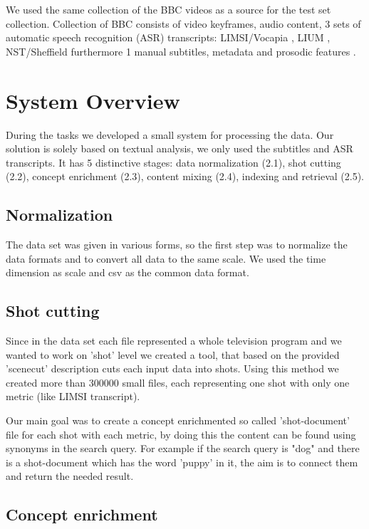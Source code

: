 \documentclass{acm_proc_article-me}
\begin{document}
We used the same collection of the BBC videos as a source for the test set collection. Collection of BBC consists of video keyframes, audio content, 3 sets of automatic speech recognition (ASR) transcripts: LIMSI/Vocapia \cite{gauvain2002limsi,lamel2012multilingual}, LIUM \cite{8307} , NST/Sheffield \cite{lanchantin2013automatic,hain2008automatic} furthermore 1 manual subtitles, metadata and prosodic features \cite{eyben2013recent}.


\section{System Overview}

During the tasks we developed a small system for processing the data. Our solution is solely based on textual analysis, we only used the subtitles and ASR transcripts. It has 5 distinctive stages: data normalization (2.1), shot cutting (2.2), concept enrichment (2.3), content mixing (2.4), indexing and retrieval (2.5).


\subsection{Normalization}
The data set was given in various forms, so the first step was to normalize the data formats and to convert all data to the same scale. We used the time dimension as scale and csv as the common data format.

\subsection{Shot cutting}

Since in the data set each file represented a whole television program and we wanted to work on 'shot' level we created a tool, that based on the provided 'scenecut' description cuts each input data into shots. Using this method we created more than 300000 small files, each representing one shot with only one metric (like LIMSI transcript).

Our main goal was to create a concept enrichmented so called 'shot-document' file for each shot with each metric, by doing this the content can be found using synonyms in the search query. For example if the search query is "dog" and there is a shot-document which has the word 'puppy' in it, the aim is to connect them and return the needed result.

\subsection{Concept enrichment}
\end{document}

